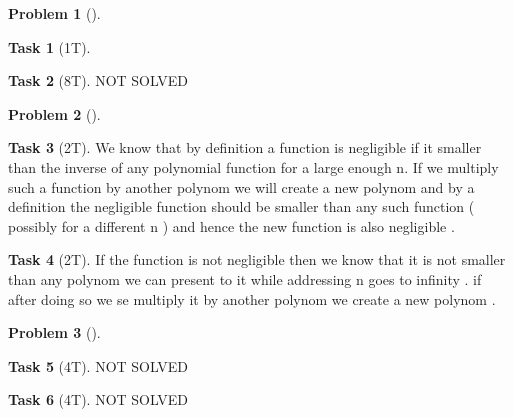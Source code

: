\documentclass[11pt,twoside]{article}
\theoremstyle{definition}
\newtheorem{amsproblem}{Problem}
\newtheorem{amssubproblem}{Task}[amsproblem]
\newenvironment{problem}[1][]{%
  \begin{amsproblem}[#1]
  }{%
  \end{amsproblem}
}
\newenvironment{subproblem}[1][]{%
  \begin{amssubproblem}[#1]
  }{%
  \end{amssubproblem}
}
\newcommand{\TP}[1]{#1T}
\begin{document}
\begin{problem}
\begin{subproblem}[\TP{1}]
    
  \end{subproblem}
  \begin{subproblem}[\TP{8}]
    NOT SOLVED %
  \end{subproblem}
\end{problem}

\noindent
\hrulefill

\begin{problem}
  \begin{subproblem}[\TP{2}]
    We know that by definition a function is negligible if it  smaller than the inverse of any polynomial function for a large enough n. If we multiply such a function by another polynom we will create a new polynom and by a definition the negligible function should be smaller than any such function ( possibly for a different n ) and hence the new function is also negligible .  %
  \end{subproblem}
  \begin{subproblem}[\TP{2}]
    If the function is not negligible then we know that  it is not smaller than any polynom we can present to it while addressing n goes to infinity . if after doing so we se multiply it by another polynom we create a new polynom .%
  \end{subproblem}
\end{problem}

\noindent
\hrulefill

\begin{problem}
  \begin{subproblem}[\TP{4}]
    NOT SOLVED %
  \end{subproblem}
  \begin{subproblem}[\TP{4}]
    NOT SOLVED %
  \end{subproblem}
\end{problem}

\noindent
\hrulefill
\end{document}
